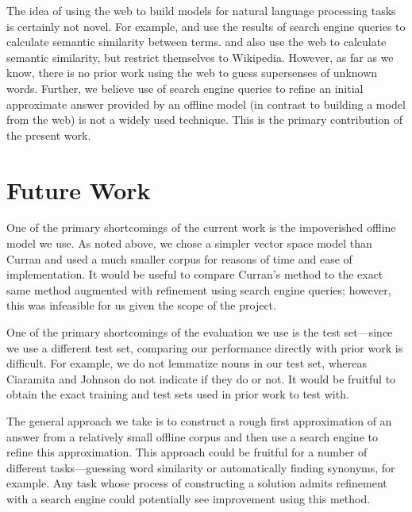 \documentclass{article}
\begin{document}

The idea of using the web to build models for natural language processing tasks is certainly not novel.
For example, \cite{bollegala} and \cite{gracia} use the results of search engine queries to calculate semantic similarity between terms.
\cite{strube} and \cite{gabrilovich} also use the web to calculate semantic similarity, but restrict themselves to Wikipedia.
However, as far as we know, there is no prior work using the web to guess supersenses of unknown words.
Further, we believe use of search engine queries to refine an initial approximate answer provided by an offline model (in contrast to building a model from the web) is not a widely used technique.
This is the primary contribution of the present work.

\section{Future Work}


One of the primary shortcomings of the current work is the impoverished offline model we use.
As noted above, we chose a simpler vector space model than Curran \cite{curran} and used a much smaller corpus for reasons of time and ease of implementation.
It would be useful to compare Curran's method to the exact same method augmented with refinement using search engine queries; however, this was infeasible for us given the scope of the project.

One of the primary shortcomings of the evaluation we use is the test set---since we use a different test set, comparing our performance directly with prior work is difficult.
For example, we do not lemmatize nouns in our test set, whereas Ciaramita and Johnson \cite{cj} do not indicate if they do or not.
It would be fruitful to obtain the exact training and test sets used in prior work to test with.

The general approach we take is to construct a rough first approximation of an answer from a relatively small offline corpus and then use a search engine to refine this approximation.
This approach could be fruitful for a number of different tasks---guessing word similarity or automatically finding synonyms, for example.
Any task whose process of constructing a solution admits refinement with a search engine  could potentially see improvement using this method.
\end{document}

